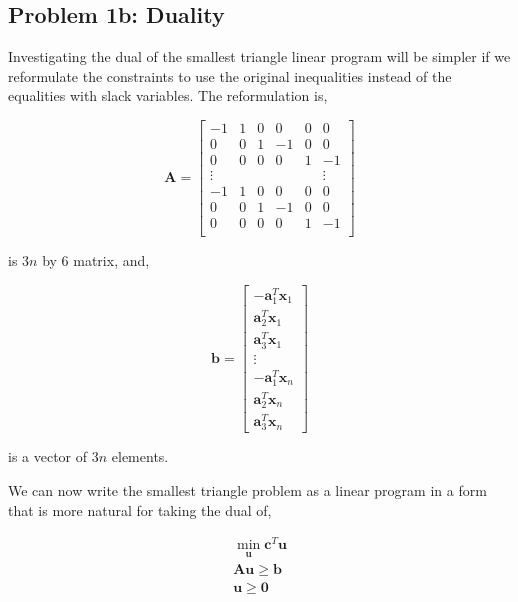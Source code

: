 \documentclass{article}
\begin{document}
\subsection{Problem 1b: Duality}

Investigating the dual of the smallest triangle linear program will be simpler if we reformulate the constraints to use the original inequalities instead of the equalities with slack variables.
The reformulation is,

\begin{equation*}
\mathbf{A} = \begin{bmatrix}
-1 & 1 & 0 & 0 & 0 & 0\\
0 & 0 & 1 & -1 & 0 & 0\\
0 & 0 & 0 & 0 & 1 & -1\\
\vdots & & & & & \vdots\\
-1 & 1 & 0 & 0 & 0 & 0\\
0 & 0 & 1 & -1 & 0 & 0\\
0 & 0 & 0 & 0 & 1 & -1\\
\end{bmatrix}
\end{equation*}

\noindent is $3n$ by $6$ matrix, and,

\begin{equation*}
\mathbf{b} = \begin{bmatrix}
-\mathbf{a}^T_1 \mathbf{x}_1\\
\mathbf{a}^T_2 \mathbf{x}_1\\
\mathbf{a}^T_3 \mathbf{x}_1\\
\vdots\\
-\mathbf{a}^T_1 \mathbf{x}_n\\
\mathbf{a}^T_2 \mathbf{x}_n\\
\mathbf{a}^T_3 \mathbf{x}_n
\end{bmatrix}
\end{equation*}

\noindent is a vector of $3n$ elements.

We can now write the smallest triangle problem as a linear program in a form that is more natural for taking the dual of,

\begin{eqnarray*}
	\min_\mathbf{u} \mathbf{c}^T \mathbf{u}\\
	\mathbf{A} \mathbf{u} \ge \mathbf{b}\\
	\mathbf{u} \ge \mathbf{0}
\end{eqnarray*}
\end{document}
